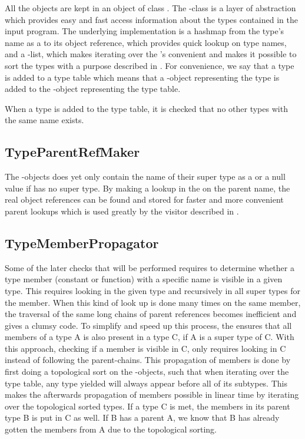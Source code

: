 All the  objects are kept in an object of class . The -class is a layer of abstraction which provides easy and fast access information about the types contained in the input program. The underlying implementation is a hashmap from the type's name as a  to its object reference, which provides quick lookup on type names, and a -list, which makes iterating over the 's convenient and makes it possible to sort the types with a purpose described in . For convenience, we say that a type is added to a type table which means that a -object representing the type is added to the -object representing the type table.

When a type is added to the type table, it is checked that no other types with the same name exists.

\subsection{TypeParentRefMaker}
\label{sec:TypeParentRefMaker}
The -objects does yet only contain the name of their super type as a  or a null value if has no super type. By making a lookup in the  on the parent name, the real object references can be found and stored for faster and more convenient parent lookups which is used greatly by the visitor described in .

\subsection{TypeMemberPropagator}
\label{sec:TypeMemberPropagator}
Some of the later checks that will be performed requires to determine whether a type member (constant or function) with a specific name is visible in a given type. This requires looking in the given type and recursively in all super types for the member. When this kind of look up is done many times on the same member, the traversal of the same long chains of parent references becomes inefficient and gives a clumsy code. To simplify and speed up this process, the  ensures that all members of a type A is also present in a type C, if A is a super type of C. With this approach, checking if a member is visible in C, only requires looking in C instead of following the parent-chains. This propagation of members is done by first doing a topological sort on the -objects, such that when iterating over the type table, any type yielded will always appear before all of its subtypes. This makes the afterwards propagation of members possible in linear time by iterating over the topological sorted types. If a type C is met, the members in its parent type B is put in C as well. If B has a parent A, we know that B has already gotten the members from A due to the topological sorting.

